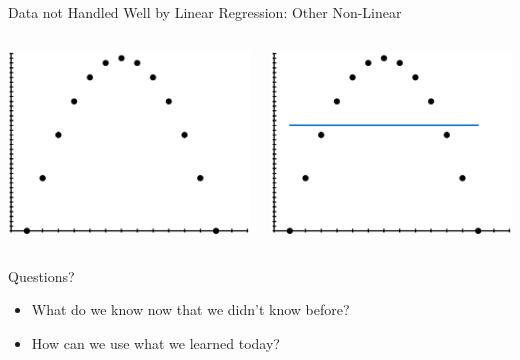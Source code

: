 \documentclass[aspectratio=169]{beamer}
\begin{document}
\begin{frame}{Data not Handled Well by Linear Regression: Other Non-Linear}
\begin{columns}
\begin{column}{0.5\textwidth}
     \includegraphics[width=1\textwidth]{lectLR/parabola.pdf} 
 \end{column}
\begin{column}{0.5\textwidth}
     \includegraphics[width=1\textwidth]{lectLR/parabolaWithLine.pdf} 
\end{column}
 \end{columns}

\end{frame}

\begin{frame}{Questions?}
\begin{itemize}
	\item What do we know now that we didn't know before?
	\vspace{5 em}
	\item How can we use what we learned today?
\end{itemize}
\end{frame}
\end{document}
